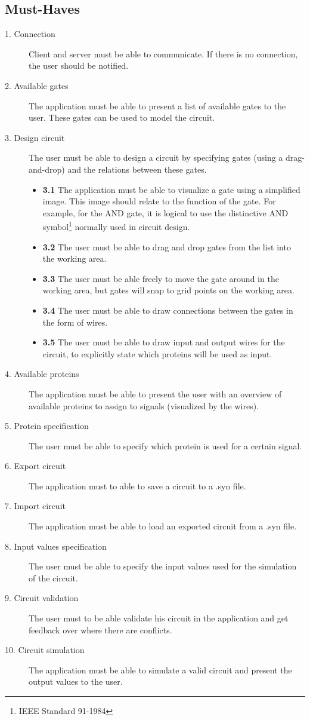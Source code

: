 \documentclass[a4paper]{article}
\begin{document}
\subsection{Must-Haves}
\begin{description}
\item[1. Connection] Client and server must be able to communicate. If there is no connection, the user should be notified.
\item[2. Available gates] The application must be able to present a list of available gates to the user. These gates can be used to model the circuit.
\item[3. Design circuit] The user must be able to design a circuit by specifying gates (using a drag-and-drop) and the relations between these gates.
	\begin{itemize}
	\item \textbf{3.1} The application must be able to visualize a gate using a simplified image. This image should relate to the function of the gate. For example, for the AND gate, it is logical to use the distinctive AND symbol\footnote{IEEE Standard 91-1984} normally used in circuit design.
	\item \textbf{3.2} The user must be able to drag and drop gates from the list into the working area.
	\item \textbf{3.3} The user must be able freely to move the gate around in the working area, but gates will snap to grid points on the working area.
	\item \textbf{3.4} The user must be able to draw connections between the gates in the form of wires.
	\item \textbf{3.5} The user must be able to draw input and output wires for the circuit, to explicitly state which proteins will be used as input.
	\end{itemize}
\item[4. Available proteins] The application must be able to present the user with an overview of available proteins to assign to signals (visualized by the wires).
\item[5. Protein specification] The user must be able to specify which protein is used for a certain signal.
\item[6. Export circuit] The application must to able to save a circuit to a .syn file.
\item[7. Import circuit] The application must be able to load an exported circuit from a .syn file.
\item[8. Input values specification] The user must be able to specify the input values used for the simulation of the circuit.
\item[9. Circuit validation] The user must to be able validate his circuit in the application and get feedback over where there are conflicts.
\item[10. Circuit simulation] The application must be able to simulate a valid circuit and present the output values to the user.
\end{description}
\end{document}
